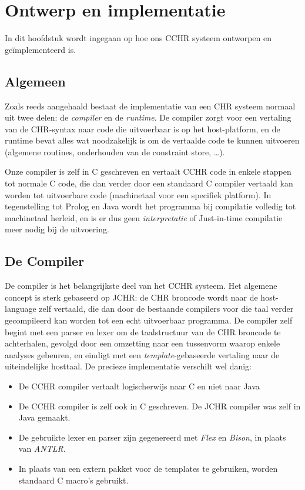 \chapter{Ontwerp en implementatie} \label{chap:impl}

In dit hoofdstuk wordt ingegaan op hoe ons CCHR systeem ontworpen en ge\"implementeerd is.

\section{Algemeen} \label{sec:impl}

Zoals reeds aangehaald bestaat de implementatie van een CHR systeem normaal uit twee delen: de {\em compiler} en de {\em runtime}. De compiler zorgt voor een vertaling van de CHR-syntax naar code die uitvoerbaar is op het host-platform, en de runtime bevat alles wat noodzakelijk is om de vertaalde code te kunnen uitvoeren (algemene routines, onderhouden van de constraint store, \ldots).

Onze compiler is zelf in C geschreven en vertaalt CCHR code in enkele stappen tot normale C code, die dan verder door een standaard C compiler vertaald kan worden tot uitvoerbare code (machinetaal voor een specifiek platform). In tegenstelling tot Prolog en Java wordt het programma bij compilatie volledig tot machinetaal herleid, en is er dus geen {\em interpretatie} of {Just-in-time compilatie} meer nodig bij de uitvoering.

\section{De Compiler} \label{sec:compiler}


De compiler is het belangrijkste deel van het CCHR systeem. Het algemene concept is sterk gebaseerd op JCHR: de CHR broncode wordt naar de host-language zelf vertaald, die dan door de bestaande compilers voor die taal verder gecompileerd kan worden tot een echt uitvoerbaar programma. De compiler zelf begint met een parser en lexer om de taalstructuur van de CHR broncode te achterhalen, gevolgd door een omzetting naar een tussenvorm waarop enkele analyses gebeuren, en eindigt met een {\em template}-gebaseerde vertaling naar de uiteindelijke hosttaal. De precieze implementatie verschilt wel danig: \begin{itemize}
  \item De CCHR compiler vertaalt logischerwijs naar C en niet naar Java
  \item De CCHR compiler is zelf ook in C geschreven. De JCHR compiler was zelf in Java gemaakt.
  \item De gebruikte lexer en parser zijn gegenereerd met {\em Flex} en {\em Bison}, in plaats van {\em ANTLR}.
  \item In plaats van een extern pakket voor de templates te gebruiken, worden standaard C macro's gebruikt.
 \end{itemize}
 
